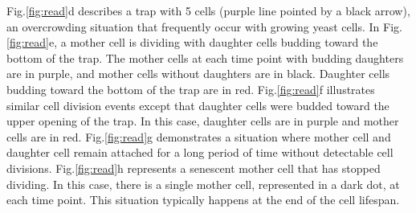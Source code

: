 \documentclass[conference]{IEEEtran}
\begin{document}
Fig.\ref{fig:read}d describes a trap with 5 cells (purple line pointed by a black arrow), an overcrowding situation that frequently occur with growing yeast cells.
In Fig.\ref{fig:read}e, a mother cell is dividing with daughter cells budding toward the bottom of the trap. The mother cells at each time point with budding daughters are in purple, and mother cells without daughters are in black. Daughter cells budding toward the bottom of the trap are in red. 
Fig.\ref{fig:read}f illustrates similar cell division events except that daughter cells were budded toward the upper opening of the trap. In this case, daughter cells are in purple and mother cells are in red. 
Fig.\ref{fig:read}g demonstrates a situation where mother cell and daughter cell remain attached for a long period of time without detectable cell divisions. 
Fig.\ref{fig:read}h represents a senescent mother cell that has stopped dividing. In this case, there is a single mother cell, represented in a dark dot, at each time point. 
This situation typically happens at the end of the cell lifespan.
\end{document}
